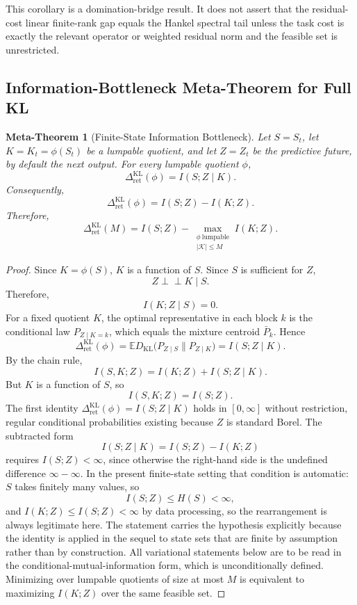 \documentclass[12pt]{article}
\newtheorem{metatheorem}[theorem]{Meta-Theorem}
\theoremstyle{definition}
\newcommand{\RetKL}{\Delta_{\mathrm{ret}}^{\mathrm{KL}}}
\begin{document}
This corollary is a domination-bridge result.  It does not assert that the
residual-cost linear finite-rank gap equals the Hankel spectral tail unless
the task cost is exactly the relevant operator or weighted residual norm and
the feasible set is unrestricted.

\subsection{Information-Bottleneck Meta-Theorem for Full KL}
\label{subsec:meta-ib}

\begin{metatheorem}[Finite-State Information Bottleneck]
\label{meta:ib}
Let $S=S_t$, let $K=K_t=\phi(S_t)$ be a lumpable quotient, and let $Z=Z_t$ be
the predictive future, by default the next output.  For every lumpable quotient
$\phi$,
\[
\RetKL(\phi)
=
I(S;Z\mid K).
\]
Consequently,
\[
\RetKL(\phi)
=
I(S;Z)-I(K;Z).
\]
Therefore,
\[
\RetKL(M)
=
I(S;Z)
-
\max_{\substack{
\phi\ \text{lumpable}\\
|\mathcal K|\le M
}}
I(K;Z).
\]
\end{metatheorem}

\begin{proof}
Since $K=\phi(S)$, $K$ is a function of $S$.  Since $S$ is sufficient for $Z$,
\[
Z\perp\!\!\!\perp K\mid S.
\]
Therefore,
\[
I(K;Z\mid S)=0.
\]
For a fixed quotient $K$, the optimal representative in each block $k$ is the
conditional law $P_{Z\mid K=k}$, which equals the mixture centroid
$\bar P_k$.  Hence
\[
\RetKL(\phi)
=
\mathbb E
D_{\mathrm{KL}}
\bigl(
P_{Z\mid S}
\|
P_{Z\mid K}
\bigr)
=
I(S;Z\mid K).
\]
By the chain rule,
\[
I(S,K;Z)
=
I(K;Z)+I(S;Z\mid K).
\]
But $K$ is a function of $S$, so
\[
I(S,K;Z)=I(S;Z).
\]
The first identity $\RetKL(\phi)=I(S;Z\mid K)$ holds in $[0,\infty]$ without
restriction, regular conditional probabilities existing because $Z$ is standard
Borel.  The subtracted form
\[
I(S;Z\mid K)
=
I(S;Z)-I(K;Z)
\]
requires $I(S;Z)<\infty$, since otherwise the right-hand side is the undefined
difference $\infty-\infty$.  In the present finite-state setting that condition
is automatic: $S$ takes finitely many values, so
\[
I(S;Z)\le H(S)<\infty ,
\]
and $I(K;Z)\le I(S;Z)<\infty$ by data processing, so the rearrangement is
always legitimate here.  The statement carries the hypothesis explicitly
because the identity is applied in the sequel to state sets that are finite by
assumption rather than by construction.  All variational
statements below are to be read in the conditional-mutual-information form,
which is unconditionally defined.
Minimizing over lumpable quotients of size at most $M$ is equivalent to
maximizing $I(K;Z)$ over the same feasible set.
\end{proof}
\end{document}
